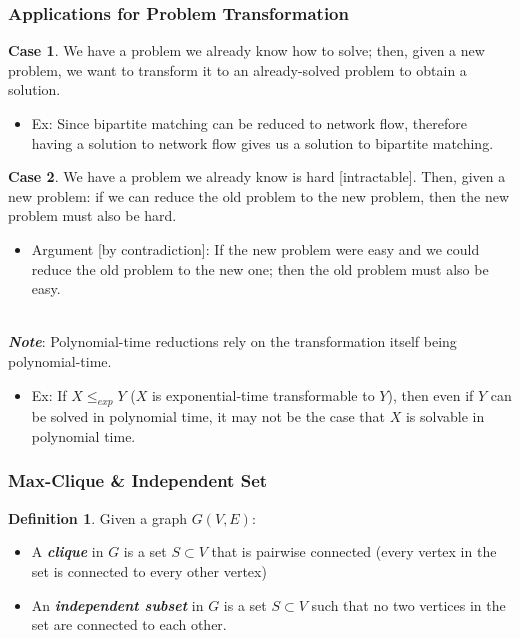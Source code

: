 \documentclass[12pt]{extarticle}
\theoremstyle{definition}
\newtheorem*{definition}{Definition}
\newtheorem{case}{\textbf{Case}}
\theoremstyle{remark}
\newcommand{\resetcases}[0]{\setcounter{case}{0}}
\begin{document}
\resetcases
\subsubsection*{Applications for Problem Transformation}
\begin{case}
    We have a problem we already know how to solve; then, given a new problem, we want to transform it to an already-solved problem to obtain a solution. \begin{itemize}
        \item Ex: Since bipartite matching can be reduced to network flow, therefore having a solution to network flow gives us a solution to bipartite matching.
    \end{itemize}
\end{case}

\begin{case}
    We have a problem we already know is hard [intractable]. Then, given a new problem: if we can reduce the old problem to the new problem, then the new problem must also be hard.\begin{itemize}
        \item Argument [by contradiction]: If the new problem were easy and we could reduce the old problem to the new one; then the old problem must also be easy.
    \end{itemize}
\end{case}

~\\
\noindent\textbf{\textit{Note}}: Polynomial-time reductions rely on the transformation itself being polynomial-time.\begin{itemize}
    \item Ex: If $X\leq_{exp}Y$ ($X$ is exponential-time transformable to $Y$), then even if $Y$ can be solved in polynomial time, it may not be the case that $X$ is solvable in polynomial time.
\end{itemize}

\pagebreak
\subsubsection{Max-Clique \& Independent Set}
\begin{definition}
    Given a graph $G(V,E)$:\begin{itemize}
        \item A \textbf{\textit{clique}} in $G$ is a set $S\subset V$ that is pairwise connected (every vertex in the set is connected to every other vertex)
        \item An \textbf{\textit{independent subset}} in $G$ is a set $S\subset V$ such that no two vertices in the set are connected to each other.
    \end{itemize}
\end{definition}
\end{document}
